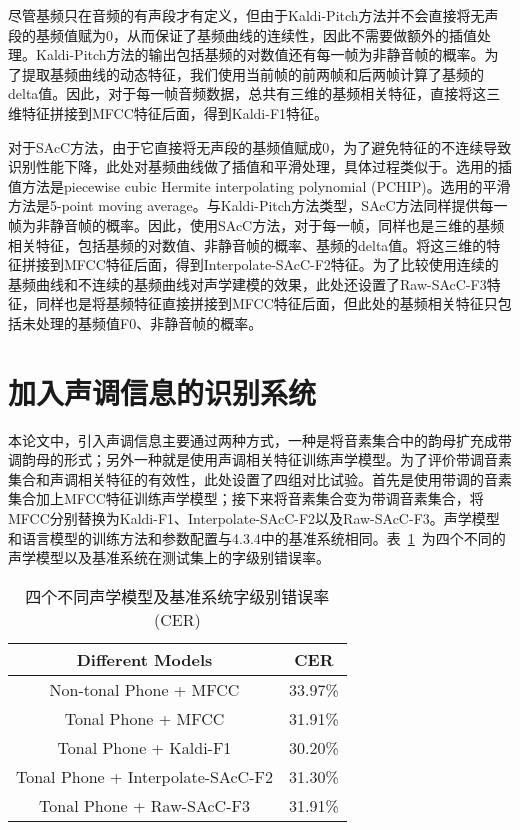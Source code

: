 尽管基频只在音频的有声段才有定义，但由于Kaldi-Pitch方法并不会直接将无声段的基频值赋为0，从而保证了基频曲线的连续性，因此不需要做额外的插值处理。Kaldi-Pitch方法的输出包括基频的对数值还有每一帧为非静音帧的概率。为了提取基频曲线的动态特征，我们使用当前帧的前两帧和后两帧计算了基频的delta值。因此，对于每一帧音频数据，总共有三维的基频相关特征，直接将这三维特征拼接到MFCC特征后面，得到Kaldi-F1特征。

对于SAcC方法，由于它直接将无声段的基频值赋成0，为了避免特征的不连续导致识别性能下降，此处对基频曲线做了插值和平滑处理，具体过程类似于\cite{lei2006improved}。选用的插值方法是piecewise cubic Hermite interpolating polynomial (PCHIP)\cite{fritsch1980monotone}。选用的平滑方法是5-point moving average。与Kaldi-Pitch方法类型，SAcC方法同样提供每一帧为非静音帧的概率。因此，使用SAcC方法，对于每一帧，同样也是三维的基频相关特征，包括基频的对数值、非静音帧的概率、基频的delta值。将这三维的特征拼接到MFCC特征后面，得到Interpolate-SAcC-F2特征。为了比较使用连续的基频曲线和不连续的基频曲线对声学建模的效果，此处还设置了Raw-SAcC-F3特征，同样也是将基频特征直接拼接到MFCC特征后面，但此处的基频相关特征只包括未处理的基频值F0、非静音帧的概率。
\section{加入声调信息的识别系统}
本论文中，引入声调信息主要通过两种方式，一种是将音素集合中的韵母扩充成带调韵母的形式；另外一种就是使用声调相关特征训练声学模型。为了评价带调音素集合和声调相关特征的有效性，此处设置了四组对比试验。首先是使用带调的音素集合加上MFCC特征训练声学模型；接下来将音素集合变为带调音素集合，将MFCC分别替换为Kaldi-F1、Interpolate-SAcC-F2以及Raw-SAcC-F3。声学模型和语言模型的训练方法和参数配置与4.3.4中的基准系统相同。表~\ref{tab:table4}~为四个不同的声学模型以及基准系统在测试集上的字级别错误率。
\begin{table}[htbp]
\caption{四个不同声学模型及基准系统字级别错误率(CER)}\label{tab:table4}
\vspace{0.5em}\centering\wuhao
\begin{tabular}{cc}
\toprule[1.5pt]
Different Models & CER \\
\midrule[1pt]
Non-tonal Phone + MFCC & 33.97\% \\
Tonal Phone + MFCC & 31.91\% \\
Tonal Phone + Kaldi-F1 & 30.20\% \\
Tonal Phone + Interpolate-SAcC-F2 & 31.30\% \\
Tonal Phone + Raw-SAcC-F3 & 31.91\% \\
\bottomrule[1.5pt]
\end{tabular}
\vspace{\baselineskip}
\end{table}

